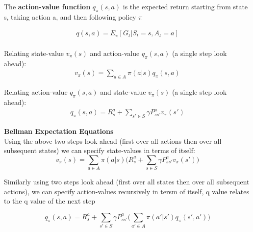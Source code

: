 \documentclass[10pt,a4paper]{article}
\begin{document}
The \textbf{action-value function}
$q_{\pi}(s,a)$ is the expected return
starting from state s, taking action a, and then following policy $\pi$

\begin{align}
	q(s,a) = E_{\pi}[G_t | S_t = s, A_t = a]
\end{align}
\\
Relating state-value $v_{\pi}(s)$ and action-value $q_{\pi}(s,a)$ (a single step look ahead):
\begin{align}
	v_{\pi}(s) = \sum_{a \in A} \pi(a|s) q_{\pi}(s,a)
\end{align}

Relating action-value $q_{\pi}(s,a)$ and state-value $v_{\pi}(s)$ (a single step look ahead):
\begin{align}
	q_{\pi}(s,a) = R_s^a + \sum_{s' \in S}\gamma P_{ss'}^a v_{\pi}(s')
\end{align}

\textbf{Bellman Expectation Equations} \\
Using the above two steps look ahead (first over all actions then over all subsequent states) we can specify state-values in terms of itself:
\begin{equation}
	v_{\pi}(s) = \sum_{a \in A} \pi(a|s) \bigg(R_s^a + \sum_{s \in S} \gamma P_{ss'}^a v_{\pi}(s')\bigg) 
\end{equation}

Similarly using two steps look ahead (first over all states then over all subsequent actions), we can specify action-values recursively in tersm of itself, q value relates to the q value of the next step

\begin{equation}
	q_{\pi}(s,a) = R^a_s + \sum_{s' \in S} \gamma P^a_{ss'} \bigg( \sum_{a' \in A} \pi(a'|s') q_{\pi}(s',a') \bigg)
\end{equation}
\end{document}
